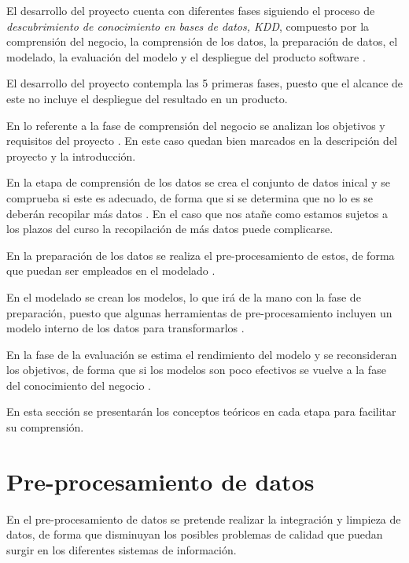 El desarrollo del proyecto cuenta con diferentes fases siguiendo el proceso de \textit{descubrimiento de conocimiento
en bases de datos, KDD}, compuesto por la comprensión del negocio, la comprensión de los datos, la preparación de datos,
el modelado, la evaluación del modelo y el despliegue del producto software \cite{book:witten2017}.


El desarrollo del proyecto contempla las 5 primeras fases, puesto que el alcance de este no incluye
el despliegue del resultado en un producto.

En lo referente a la fase de comprensión del negocio se analizan los objetivos y requisitos del proyecto \cite{book:witten2017}. 
En este caso quedan bien marcados en la descripción del proyecto y la introducción.

En la etapa de comprensión de los datos se crea el conjunto de datos inical y se comprueba si este es adecuado,
de forma que si se determina que no lo es se deberán recopilar más datos \cite{book:witten2017}.
En el caso que nos atañe como estamos sujetos a los plazos del curso la recopilación de más datos puede complicarse.

En la preparación de los datos se realiza el pre-procesamiento de estos, de forma que puedan ser empleados en el modelado \cite{book:witten2017}.

En el modelado se crean los modelos, lo que irá de la mano con la fase de preparación, puesto que algunas herramientas de 
pre-procesamiento incluyen un modelo interno de los datos para transformarlos \cite{book:witten2017}.

En la fase de la evaluación se estima el rendimiento del modelo y se reconsideran los objetivos, de forma que si los modelos son poco efectivos
se vuelve a la fase del conocimiento del negocio \cite{book:witten2017}.

En esta sección se presentarán los conceptos teóricos en cada etapa para facilitar su comprensión.

\section{Pre-procesamiento de datos}
En el pre-procesamiento de datos se pretende realizar la integración y limpieza de datos, de forma que disminuyan los posibles problemas
de calidad que puedan surgir en los diferentes sistemas de información.


